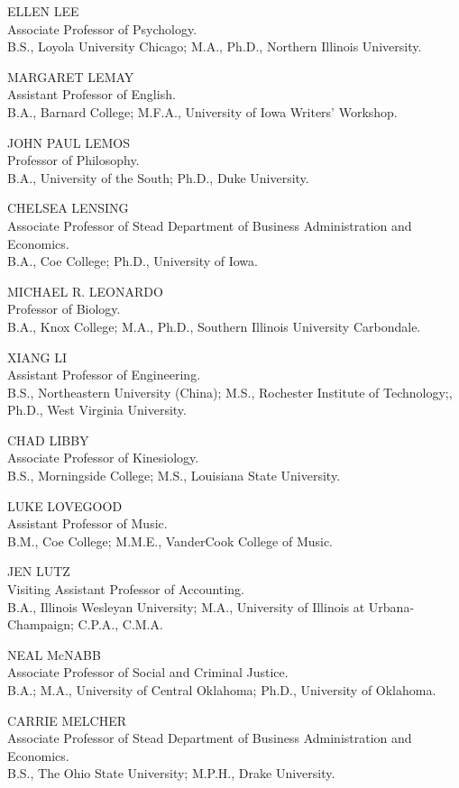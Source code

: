 \documentclass[
  letterpaper,
]{scrbook}
\begin{document}
ELLEN LEE\\
Associate Professor of Psychology.\\
B.S., Loyola University Chicago; M.A., Ph.D., Northern Illinois
University.

MARGARET LEMAY\\
Assistant Professor of English.\\
B.A., Barnard College; M.F.A., University of Iowa Writers' Workshop.

JOHN PAUL LEMOS\\
Professor of Philosophy.\\
B.A., University of the South; Ph.D., Duke University.

CHELSEA LENSING\\
Associate Professor of Stead Department of Business Administration and
Economics.\\
B.A., Coe College; Ph.D., University of Iowa.

MICHAEL R. LEONARDO\\
Professor of Biology.\\
B.A., Knox College; M.A., Ph.D., Southern Illinois University
Carbondale.

XIANG LI\\
Assistant Professor of Engineering.\\
B.S., Northeastern University (China); M.S., Rochester Institute of
Technology;, Ph.D., West Virginia University.

CHAD LIBBY\\
Associate Professor of Kinesiology.\\
B.S., Morningside College; M.S., Louisiana State University.

LUKE LOVEGOOD\\
Assistant Professor of Music.\\
B.M., Coe College; M.M.E., VanderCook College of Music.

JEN LUTZ\\
Visiting Assistant Professor of Accounting.\\
B.A., Illinois Wesleyan University; M.A., University of Illinois at
Urbana-Champaign; C.P.A., C.M.A.

NEAL McNABB\\
Associate Professor of Social and Criminal Justice.\\
B.A.; M.A., University of Central Oklahoma; Ph.D., University of
Oklahoma.

CARRIE MELCHER\\
Associate Professor of Stead Department of Business Administration and
Economics.\\
B.S., The Ohio State University; M.P.H., Drake University.
\end{document}
